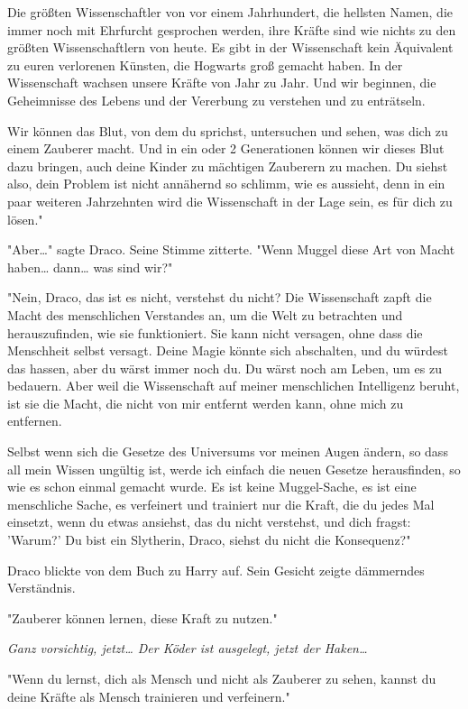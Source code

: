 {Die größten Wissenschaftler von vor einem Jahrhundert, die hellsten Namen, die immer noch mit Ehrfurcht gesprochen werden, ihre Kräfte sind wie nichts zu den größten Wissenschaftlern von heute. Es gibt in der Wissenschaft kein Äquivalent zu euren verlorenen Künsten, die Hogwarts groß gemacht haben. In der Wissenschaft wachsen unsere Kräfte von Jahr zu Jahr. Und wir beginnen, die Geheimnisse des Lebens und der Vererbung zu verstehen und zu enträtseln.

Wir können das Blut, von dem du sprichst, untersuchen und sehen, was dich zu einem Zauberer macht. Und in ein oder 2 Generationen können wir dieses Blut dazu bringen, auch deine Kinder zu mächtigen Zauberern zu machen. Du siehst also, dein Problem ist nicht annähernd so schlimm, wie es aussieht, denn in ein paar weiteren Jahrzehnten wird die Wissenschaft in der Lage sein, es für dich zu lösen."

"Aber…" sagte Draco. Seine Stimme zitterte. "Wenn Muggel diese Art von Macht haben… dann… was sind wir?"

"Nein, Draco, das ist es nicht, verstehst du nicht? Die Wissenschaft zapft die Macht des menschlichen Verstandes an, um die Welt zu betrachten und herauszufinden, wie sie funktioniert. Sie kann nicht versagen, ohne dass die Menschheit selbst versagt. Deine Magie könnte sich abschalten, und du würdest das hassen, aber du wärst immer noch du. Du wärst noch am Leben, um es zu bedauern. Aber weil die Wissenschaft auf meiner menschlichen Intelligenz beruht, ist sie die Macht, die nicht von mir entfernt werden kann, ohne mich zu entfernen.

Selbst wenn sich die Gesetze des Universums vor meinen Augen ändern, so dass all mein Wissen ungültig ist, werde ich einfach die neuen Gesetze herausfinden, so wie es schon einmal gemacht wurde. Es ist keine Muggel-Sache, es ist eine menschliche Sache, es verfeinert und trainiert nur die Kraft, die du jedes Mal einsetzt, wenn du etwas ansiehst, das du nicht verstehst, und dich fragst: 'Warum?' Du bist ein Slytherin, Draco, siehst du nicht die Konsequenz?"

Draco blickte von dem Buch zu Harry auf. Sein Gesicht zeigte dämmerndes Verständnis.

"Zauberer können lernen, diese Kraft zu nutzen."

\emph{Ganz vorsichtig, jetzt… Der Köder ist ausgelegt, jetzt der Haken…}

"Wenn du lernst, dich als Mensch und nicht als Zauberer zu sehen, kannst du deine Kräfte als Mensch trainieren und verfeinern."

}
